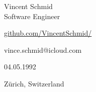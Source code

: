 {\sectionfont\fontsize{30}{30}\selectfont
Vincent Schmid\\[0.25em]
}
{\sectionfont\fontsize{14}{14}\selectfont\color{altColor}
Software Engineer\\[1.2em]
}
\begin{minipage}[t]{0.55\textwidth}
    \begin{description}[labelwidth=2em]
        \item[\faGithub\color{altColor}] \href{https://github.com/VincentSchmid/}{github.com/VincentSchmid/}
        \item[\faEnvelopeO\color{altColor}] vince.schmid@icloud.com
    \end{description}
\end{minipage}
\hfill
\begin{minipage}[t]{0.4\textwidth}
    \begin{description}[labelwidth=2em]
        \item[\faBirthdayCake\color{altColor}] 04.05.1992
        \item[\faMapMarker\color{altColor}] Zürich, Switzerland
    \end{description}
\end{minipage}
